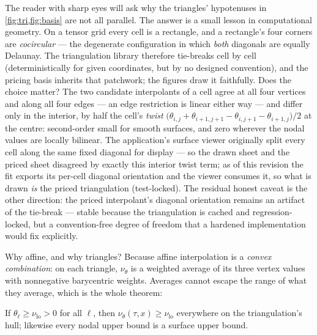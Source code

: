\documentclass[11pt]{article}
\begin{document}
\begin{remark}
\label{rem:degenerate}
The reader with sharp eyes will ask why the triangles' hypotenuses in
\cref{fig:tri,fig:basis} are not all parallel.  The answer is a small
lesson in computational geometry.  On a tensor grid every cell is a
rectangle, and a rectangle's four corners are \emph{cocircular} --- the
degenerate configuration in which \emph{both} diagonals are equally
Delaunay.  The triangulation library therefore tie-breaks cell by cell
(deterministically for given coordinates, but by no designed convention),
and the pricing basis inherits that patchwork; the figures draw it
faithfully.  Does the choice matter?  The two candidate interpolants of a
cell agree at all four vertices and along all four edges --- an edge
restriction is linear either way --- and differ only in the interior, by
half the cell's \emph{twist}
$\big(\theta_{i,j}+\theta_{i+1,j+1}-\theta_{i,j+1}-\theta_{i+1,j}\big)/2$
at the centre: second-order small for smooth surfaces, and zero wherever
the nodal values are locally bilinear.  The application's surface viewer
originally split every cell along the same fixed diagonal for display ---
so the drawn sheet and the priced sheet disagreed by exactly this interior
twist term; as of this revision the fit exports its per-cell diagonal
orientation and the viewer consumes it, so what is drawn \emph{is} the
priced triangulation (test-locked).  The residual honest caveat is the
other direction: the priced interpolant's diagonal orientation remains an
artifact of the tie-break --- stable because the triangulation is cached
and regression-locked, but a convention-free degree of freedom that a
hardened implementation would fix explicitly.
\end{remark}

Why affine, and why triangles?  Because affine interpolation is a
\emph{convex combination}: on each triangle, $\nu_\theta$ is a weighted
average of its three vertex values with nonnegative barycentric weights.
Averages cannot escape the range of what they average, which is the whole
theorem:

\begin{proposition}
\label{prop:nodal}
If $\theta_\ell\ge\nu_{\mathrm{lo}}>0$ for all $\ell$, then
$\nu_\theta(\tau,x)\ge\nu_{\mathrm{lo}}$ everywhere on the triangulation's
hull; likewise every nodal upper bound is a surface upper bound.
\end{proposition}
\end{document}

